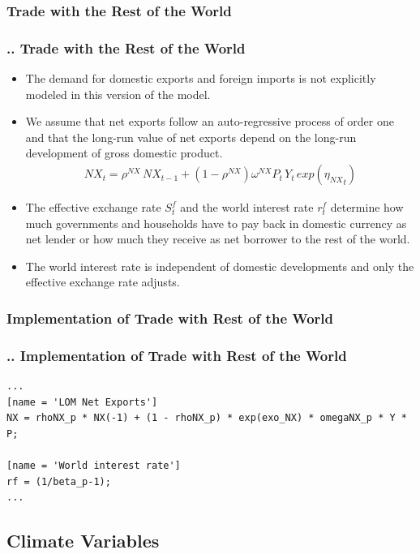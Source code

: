 \documentclass[11pt,aspectratio=169]{beamer}
\begin{document}
\subsubsection{Trade with the Rest of the World}
\begin{frame}
\frametitle{{\thesection.\thesubsection.\thesubsubsection} Trade with the Rest of the World}
\scriptsize
\begin{itemize}
\item The demand for domestic exports and foreign imports is not explicitly modeled in this version of the model. 
\item We assume that net exports follow an auto-regressive process of order one and that the long-run value of net exports depend on the long-run development of gross domestic product.
\begin{align*}
NX_{t} = \rho^{NX} \, NX_{t-1} + (1 - \rho^{NX}) \omega^{NX} P_{t} \, Y_{t} \, exp\left({{\eta_{NX}}_{t}}\right)
\end{align*}
\item The effective exchange rate $S^f_{t}$ and the world interest rate $r^{f}_{t}$ determine how much governments and households have to pay back in domestic currency as net lender or how much they receive as net borrower to the rest of the world.
 \item The world interest rate is independent of domestic developments and only the effective exchange rate adjusts.
\end{itemize}
\end{frame}

\subsubsection{Implementation of Trade with Rest of the World}
\begin{frame}[fragile]
\frametitle{{\thesection.\thesubsection.\thesubsubsection} Implementation of Trade with Rest of the World}

\begin{lstlisting}[frame = single]
...
[name = 'LOM Net Exports']
NX = rhoNX_p * NX(-1) + (1 - rhoNX_p) * exp(exo_NX) * omegaNX_p * Y * P;

[name = 'World interest rate']
rf = (1/beta_p-1);
...
\end{lstlisting}
\end{frame}

\subsection{Climate Variables}
\end{document}
